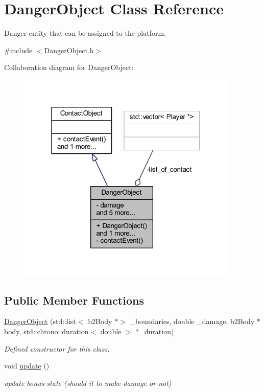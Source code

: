 \hypertarget{class_danger_object}{}\section{Danger\+Object Class Reference}
\label{class_danger_object}


Danger entity that can be assigned to the platform.  




{\ttfamily \#include $<$Danger\+Object.\+h$>$}



Collaboration diagram for Danger\+Object\+:\nopagebreak
\begin{figure}[H]
\begin{center}
\leavevmode
\includegraphics[width=298pt]{class_danger_object__coll__graph}
\end{center}
\end{figure}
\subsection*{Public Member Functions}
\begin{DoxyCompactItemize}
\item 
\hyperlink{class_danger_object_a87186516066d7d47dcea87eec44ee616}{Danger\+Object} (std\+::list$<$ b2\+Body $\ast$$>$ \+\_\+boundaries, double \+\_\+damage, b2\+Body $\ast$body, std\+::chrono\+::duration$<$ double $>$ $\ast$\+\_\+duration)
\begin{DoxyCompactList}\small\item\em Defined constructor for this class. \end{DoxyCompactList}\item 
\mbox{\label{class_danger_object_a0c058336c21ee3e9b8fca876adda2dda}} 
void \hyperlink{class_danger_object_a0c058336c21ee3e9b8fca876adda2dda}{update} ()
\begin{DoxyCompactList}\small\item\em update bonus state (should it to make damage or not) \end{DoxyCompactList}\end{DoxyCompactItemize}
